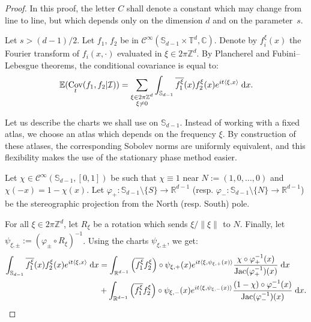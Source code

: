 \documentclass[10pt]{amsart}
\theoremstyle{definition}\newtheorem{defi}[theo]{Definition}\newtheorem{rema}[theo]{Remark}\newtheorem{exam}[theo]{Example}\newtheorem{exem}[theo]{Example}\newtheorem{nota}[theo]{Notation}
\DeclareMathOperator{\Cov}{Cov}
\DeclareMathOperator{\Jac}{Jac}
\newcommand{\Z}{\mathbb{Z}}
\newcommand{\R}{\mathbb{R}}
\newcommand{\Cbb}{\mathbb{C}}
\newcommand{\Ebb}{\mathbb{E}}
\newcommand{\Sbb}{\mathbb{S}}
\newcommand{\Tbb}{\mathbb{T}}
\newcommand{\Ccal}{\mathcal{C}}
\newcommand{\Ical}{\mathcal{I}}
\newcommand{\dd}{\;{\rm d}}
\newcommand{\norm}[2]{\left\| #1 \right\|_{#2}}
\begin{document}
\begin{proof}
In this proof, the letter $C$ shall denote a constant which may change from line to line, but which depends only on the dimension $d$ and on the parameter~$s$.


Let $s > (d-1)/2$. Let $f_1$, $f_2$ be in $\Ccal^\infty (\Sbb_{d-1} \times \Tbb^d, \Cbb)$. Denote by $f_i^\xi (x)$ the Fourier transform of $f_i(x, \cdot)$ evaluated in $\xi \in 2\pi\Z^d$. By Plancherel and Fubini--Lebesgue theorems, the conditional covariance is equal to:
\[
\Ebb (\Cov_t (f_1, f_2|\Ical)) = \sum_{\substack{\xi \in 2\pi\Z^d \\ \xi \neq 0}} \int_{\Sbb_{d-1}} \overline{f_1^\xi} (x) f_2^\xi (x) e^{i t \langle \xi, x \rangle} \dd x.
\]

Let us describe the charts we shall use on $\Sbb_{d-1}$. Instead of working with a fixed atlas, we choose an atlas which depends on the frequency $\xi$. By construction of these atlases, the corresponding Sobolev norms are uniformly equivalent, and this flexibility makes the use of the stationary phase method easier.


Let $\chi \in \Ccal^\infty (\Sbb_{d-1}, [0,1])$ be such that $\chi \equiv 1$ near $N:= (1,0, \ldots, 0)$ and\linebreak$\chi (-x) = 1-\chi (x)$. Let $\varphi_+ : \Sbb_{d-1} \setminus \{S\} \to \R^{d-1}$ (resp. $\varphi_- : \Sbb_{d-1} \setminus \{N\} \to \R^{d-1}$) be the stereographic projection from the North (resp. South) pole.


For all $\xi \in 2\pi\Z^d$, let $R_\xi$ be a rotation which sends $\xi/\norm{\xi}{}$ to $N$. Finally, let $\psi_{\xi,\pm} := (\varphi_{\pm} \circ R_\xi)^{-1}$. Using the charts $\psi_{\xi,\pm}$, we get:
\begin{align*}
\int_{\Sbb_{d-1}} \overline{f_1^\xi} (x) f_2^\xi (x) e^{i t \langle \xi, x \rangle} \dd x  &= \int_{\R^{d-1}} \left(\overline{f_1^\xi} f_2^\xi \right) \circ \psi_{\xi,+} (x) e^{i t \langle \xi, \psi_{\xi,+} (x) \rangle} \frac{\chi \circ \varphi_+^{-1} (x)}{\Jac (\varphi_+^{-1}) (x)} \dd x \\
&+ \int_{\R^{d-1}} \left(\overline{f_1^\xi} f_2^\xi \right) \circ \psi_{\xi,-} (x) e^{i t \langle \xi, \psi_{\xi,-} (x) \rangle} \frac{(1-\chi) \circ \varphi_-^{-1} (x)}{\Jac (\varphi_-^{-1}) (x)} \dd x.
\end{align*}


\end{proof}
\end{document}
